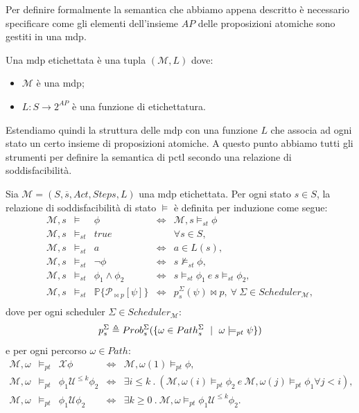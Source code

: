 Per definire formalmente la semantica che abbiamo appena descritto è necessario specificare come gli elementi dell'insieme $AP$ delle proposizioni atomiche sono gestiti in una \ac{mdp}.
\begin{mtdef}
	Una \ac{mdp} etichettata è una tupla $(\mathcal{M},L)$ dove:
	\begin{itemize}
		\item $\mathcal{M}$ è una \ac{mdp};
		\item $L:S\rightarrow 2^{AP}$ è una funzione di etichettatura.
	\end{itemize}
\end{mtdef}
Estendiamo quindi la struttura delle \ac{mdp} con una funzione $L$ che associa ad ogni stato un certo insieme di proposizioni atomiche. A questo punto abbiamo tutti gli strumenti per definire la semantica di \ac{pctl} secondo una relazione di soddisfacibilità.
\begin{mtdef}
	Sia $\mathcal{M} = (S,\overline{s},Act,Steps,L)$ una \ac{mdp} etichettata. Per ogni stato $s \in S$, la relazione di soddisfacibilità di stato $\models$ è definita per induzione come segue:
$$
	\begin{array}{rllcl}
		\mathcal{M},s &\models& \phi &\Leftrightarrow& \mathcal{M},s \models_{st} \phi \\
		\mathcal{M},s &\models_{st}& true && \forall s \in S, \\
		\mathcal{M},s &\models_{st}& \mathit{a} &\Leftrightarrow& \mathit{a} \in L(s), \\
		\mathcal{M},s &\models_{st}& \neg\phi &\Leftrightarrow& s \not\models_{st} \phi, \\
		\mathcal{M},s &\models_{st}& \phi_1 \wedge \phi_2 &\Leftrightarrow& s\models_{st}\phi_1 \ e\ s\models_{st}\phi_2, \\
		\mathcal{M},s &\models_{st}& \mathbb{P}\{ \mathcal{P}_{\bowtie p}[\psi]\} &\Leftrightarrow& p_s^\Sigma(\psi)\bowtie p,\ \forall\ \Sigma \in Scheduler_\mathcal{M}, \\
	\end{array}
$$
dove per ogni scheduler $\Sigma \in Scheduler_\mathcal{M}$:
$$
p_s^\Sigma \triangleq Prob_s^\Sigma(\{\omega \in Path_s^\Sigma \mbox{ }\mid\mbox{ } \omega \models_{pt} \psi\})
$$
e per ogni percorso $\omega \in Path$:
$$
\begin{array}{rclcl}
	\mathcal{M},\omega & \models_{pt} & \mathcal{X}\phi & \Leftrightarrow & \mathcal{M},\omega(1) \models_{pt} \phi, \\
	\mathcal{M},\omega & \models_{pt} & \phi_1 \mathcal{U}^{\leq k} \phi_2 & \Leftrightarrow & \exists i \leq k\ .\ (\mathcal{M},\omega(i) \models_{pt} \phi_2\ e\ \mathcal{M},\omega(j) \models_{pt} \phi_1 \forall j < i), \\
	\mathcal{M},\omega & \models_{pt} & \phi_1 \mathcal{U} \phi_2 & \Leftrightarrow & \exists k \geq 0\ .\ \mathcal{M},\omega \models_{pt} \phi_1 \mathcal{U}^{\leq k} \phi_2. \\
\end{array}
$$
\end{mtdef}
